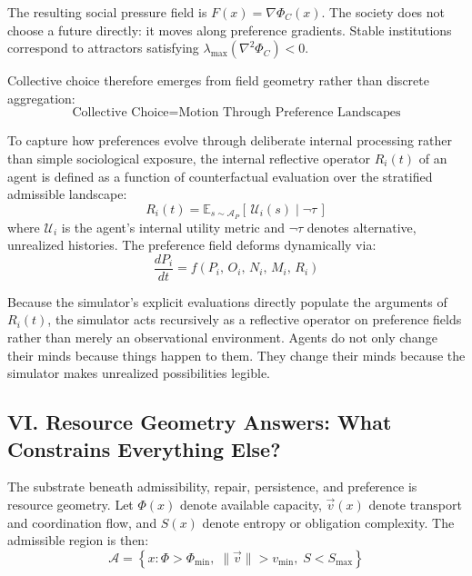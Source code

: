 \documentclass[12pt]{article}
\begin{document}
The resulting social pressure field is $F(x) = \nabla \Phi_C(x)$. The society does not choose a future directly: it moves along preference gradients. Stable institutions correspond to attractors satisfying $\lambda_{\max}(\nabla^2 \Phi_C) < 0$.

Collective choice therefore emerges from field geometry rather than discrete aggregation:
\begin{equation}
  \boxed{\text{Collective Choice} = \text{Motion Through Preference Landscapes}}
\end{equation}

To capture how preferences evolve through deliberate internal processing rather than simple sociological exposure, the internal reflective operator $R_i(t)$ of an agent is defined as a function of counterfactual evaluation over the stratified admissible landscape:
\begin{equation}
  R_i(t) = \mathbb{E}_{s \sim \mathcal{A}_P}\!\left[\, \mathcal{U}_i(s) \mid \neg\tau \,\right]
\end{equation}
where $\mathcal{U}_i$ is the agent's internal utility metric and $\neg\tau$ denotes alternative, unrealized histories. The preference field deforms dynamically via:
\begin{equation}
  \frac{dP_i}{dt} = f(P_i,\, O_i,\, N_i,\, M_i,\, R_i)
\end{equation}

Because the simulator's explicit evaluations directly populate the arguments of $R_i(t)$, the simulator acts recursively as a reflective operator on preference fields rather than merely an observational environment. Agents do not only change their minds because things happen to them. They change their minds because the simulator makes unrealized possibilities legible.

\subsection{VI. Resource Geometry Answers: What Constrains Everything Else?}

The substrate beneath admissibility, repair, persistence, and preference is resource geometry. Let $\Phi(x)$ denote available capacity, $\vec{v}(x)$ denote transport and coordination flow, and $S(x)$ denote entropy or obligation complexity. The admissible region is then:
\begin{equation}
  \mathcal{A} = \left\{x : \Phi > \Phi_{\min},\; \|\vec{v}\| > v_{\min},\; S < S_{\max}\right\}
\end{equation}
\end{document}
